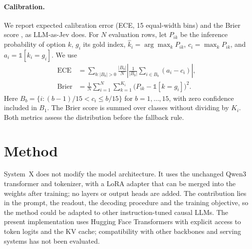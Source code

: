 \documentclass[11pt]{article}
\begin{document}
\paragraph{Calibration.}
We report expected calibration error (ECE, 15 equal-width bins) \citep{naeini2015ece,guo2017calibration} and the Brier score \citep{brier1950}, as LLM-as-Jev does. For $N$ evaluation rows, let $P_{ik}$ be the inference probability of option $k$, $g_i$ its gold index, $\hat k_i=\arg\max_k P_{ik}$, $c_i=\max_k P_{ik}$, and $a_i=\mathbb{1}[\hat k_i=g_i]$. We use
\begin{align}
\operatorname{ECE}&=\sum_{b:|B_b|>0}\frac{|B_b|}{N}
\left|\frac{1}{|B_b|}\sum_{i\in B_b}(a_i-c_i)\right|,\\
\operatorname{Brier}&=\frac{1}{N}\sum_{i=1}^{N}\sum_{k=1}^{K_i}
\bigl(P_{ik}-\mathbb{1}[k=g_i]\bigr)^2.
\end{align}
Here $B_b=\{i:(b-1)/15<c_i\le b/15\}$ for $b=1,\ldots,15$, with zero confidence included in $B_1$. The Brier score is summed over classes without dividing by $K_i$. Both metrics assess the distribution before the fallback rule.

\section{Method}

System~X does not modify the model architecture. It uses the unchanged Qwen3 transformer and tokenizer, with a LoRA adapter that can be merged into the weights after training; no layers or output heads are added. The contribution lies in the prompt, the readout, the decoding procedure and the training objective, so the method could be adapted to other instruction-tuned causal LLMs. The present implementation uses Hugging Face Transformers with explicit access to token logits and the KV cache; compatibility with other backbones and serving systems has not been evaluated.
\end{document}
